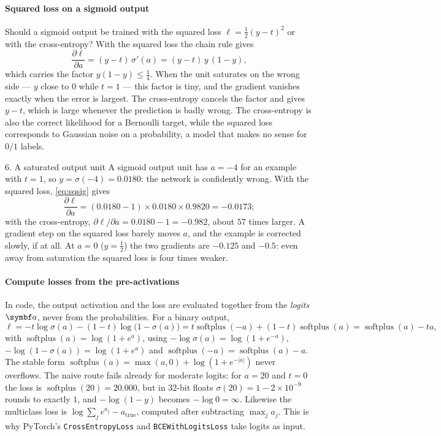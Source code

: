 \documentclass[11pt]{article}
\newcommand{\va}{\vect{a}}
\newcommand{\softplus}{\operatorname{softplus}}
\begin{document}
\paragraph{Squared loss on a sigmoid output} Should a sigmoid output be trained with the squared loss $\ell = \frac12(y -
t)^2$ or with the cross-entropy? With the squared loss the chain rule gives
\begin{equation}\label{eq:sqsig}
  \frac{\partial \ell}{\partial a} = (y - t)\,\sigma'(a) = (y - t)\,y\,(1 - y) ,
\end{equation}
which carries the factor $y(1 - y) \le \frac14$. When the unit saturates on the wrong side --- $y$ close to $0$ while
$t = 1$ --- this factor is tiny, and the gradient vanishes exactly when the error is largest. The cross-entropy cancels
the factor and gives $y - t$, which is large whenever the prediction is badly wrong. The cross-entropy is also the
correct likelihood for a Bernoulli target, while the squared loss corresponds to Gaussian noise on a probability, a
model that makes no sense for $0/1$ labels.

\begin{worked}{6. A saturated output unit}
A sigmoid output unit has $a = -4$ for an example with $t = 1$, so $y = \sigma(-4) = 0.0180$: the network is
confidently wrong. With the squared loss, \eqref{eq:sqsig} gives
\[
  \frac{\partial \ell}{\partial a} = (0.0180 - 1) \times 0.0180 \times 0.9820 = -0.0173 ;
\]
with the cross-entropy, $\partial \ell/\partial a = 0.0180 - 1 = -0.982$, about $57$ times larger. A gradient step on the
squared loss barely moves $a$, and the example is corrected slowly, if at all. At $a = 0$ ($y = \frac12$) the two
gradients are $-0.125$ and $-0.5$: even away from saturation the squared loss is four times weaker.
\end{worked}

\paragraph{Compute losses from the pre-activations} In code, the output activation and the loss are evaluated together
from the \emph{logits} $\va$, never from the probabilities. For a binary output,
\[
  \ell = -t\log\sigma(a) - (1 - t)\log\big(1 - \sigma(a)\big) = t\softplus(-a) + (1 - t)\softplus(a) = \softplus(a) - ta,
\]
with $\softplus(a) = \log(1 + e^a)$, using $-\log\sigma(a) = \log(1 + e^{-a})$, $-\log(1 - \sigma(a)) = \log(1 + e^a)$
and $\softplus(-a) = \softplus(a) - a$. The stable form $\softplus(a) = \max(a, 0) + \log(1 + e^{-|a|})$ never
overflows. The naive route fails already for moderate logits: for $a = 20$ and $t = 0$ the loss is $\softplus(20) =
20.000$, but in 32-bit floats $\sigma(20) = 1 - 2 \times 10^{-9}$ rounds to exactly $1$, and $-\log(1 - y)$ becomes
$-\log 0 = \infty$.
Likewise the multiclass loss is $\log\sum_j e^{a_j} - a_{\mathrm{true}}$, computed after subtracting $\max_j a_j$.
This is why PyTorch's \texttt{CrossEntropyLoss} and \texttt{BCEWithLogitsLoss} take logits as input.
\end{document}
